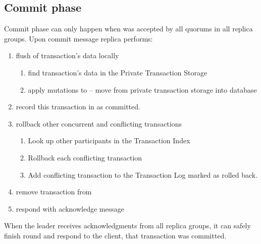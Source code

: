\subsection{Commit phase}
Commit phase can only happen when \txState was accepted by all quorums in all replica groups. Upon commit message replica performs:
\begin{enumerate}
\item flush of transaction’s data locally
\begin{enumerate}
   \item find transaction’s data in the Private Transaction Storage
   \item apply mutations to \database -- move \mutations from private transaction storage into database
   \end{enumerate}
\item record this transaction in \txLog as committed.
\item rollback other concurrent and conflicting transactions
 \begin{enumerate}
   \item Look up other participants in the Transaction Index
   \item Rollback each conflicting transaction
   \item Add conflicting transaction to the Transaction Log marked as rolled back.
  \end{enumerate}
\item remove transaction from \txIndex
\item respond with acknowledge message
\end{enumerate}

When the leader receives acknowledgments from all replica groups, it can safely finish \mpt round and respond to the client, that transaction was committed.



